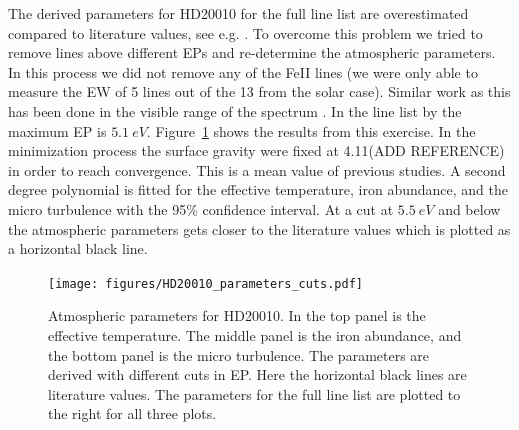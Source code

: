 \documentclass{aa}
\begin{document}
The derived parameters for HD20010 for the full line list
are overestimated compared to literature values, see e.g.
\citet{Mortier2013,lebzelter2012}. To overcome this problem we
tried to remove lines above different EPs and re-determine the
atmospheric parameters. In this process we did not remove any of
the FeII lines (we were only able to measure the EW of 5 lines out
of the 13 from the solar case). Similar work as this has been done
in the visible range of the spectrum \citep{tsantaki2013}. In the
line list by \citep{tsantaki2013} the maximum EP is $\SI{5.1}{eV}$.
Figure~\ref{fig:HD20010_parameters_cuts} shows the results from this
exercise. In the minimization process the surface gravity were fixed
at 4.11(ADD REFERENCE) in order to reach convergence. This is a mean
value of previous studies. A second degree polynomial is fitted for the
effective temperature, iron abundance, and the micro turbulence with
the 95\% confidence interval. At a cut at $\SI{5.5}{eV}$ and below the
atmospheric parameters gets closer to the literature values which is
plotted as a horizontal black line.


\begin{figure}[htpb!]
    \centering
    \texttt{[image: figures/HD20010\_parameters\_cuts.pdf]}
    \caption{Atmospheric parameters for HD20010. In the top panel is the
    effective temperature. The middle panel is the iron abundance, and the
    bottom panel is the micro turbulence. The parameters are derived with
    different cuts in EP. Here the horizontal black lines are literature values.
    The parameters for the full line list are plotted to the right for all
    three plots.}
    \label{fig:HD20010_parameters_cuts}
\end{figure}











\newpage


\nocite*{}
\end{document}
